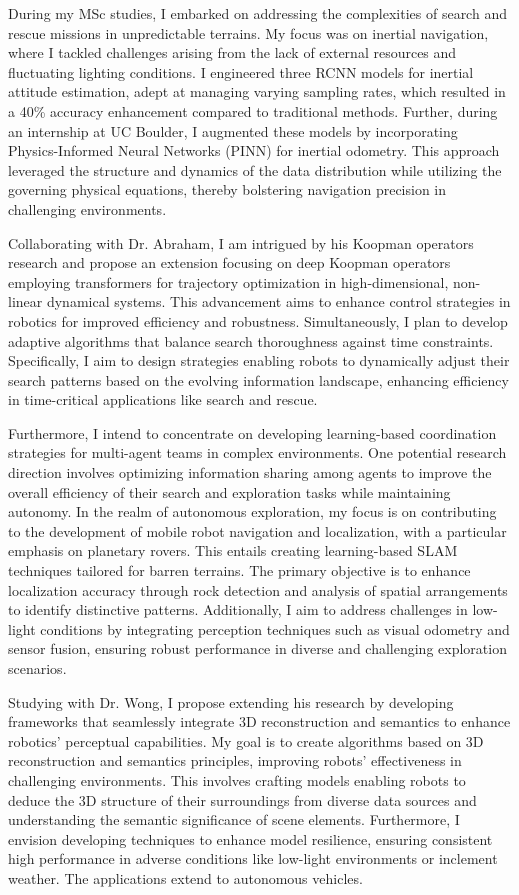 \documentclass[a4,20pt]{article}
\begin{document}
\begin{large}
During my MSc studies, I embarked on addressing the complexities of search and rescue missions in unpredictable terrains. My focus was on inertial navigation, where I tackled challenges arising from the lack of external resources and fluctuating lighting conditions. I engineered three RCNN models for inertial attitude estimation, adept at managing varying sampling rates, which resulted in a 40\% accuracy enhancement compared to traditional methods. Further, during an internship at UC Boulder, I augmented these models by incorporating Physics-Informed Neural Networks (PINN) for inertial odometry. This approach leveraged the structure and dynamics of the data distribution while utilizing the governing physical equations, thereby bolstering navigation precision in challenging environments.

Collaborating with Dr. Abraham, I am intrigued by his Koopman operators research and propose an extension focusing on deep Koopman operators employing transformers for trajectory optimization in high-dimensional, non-linear dynamical systems. This advancement aims to enhance control strategies in robotics for improved efficiency and robustness. Simultaneously, I plan to develop adaptive algorithms that balance search thoroughness against time constraints. Specifically, I aim to design strategies enabling robots to dynamically adjust their search patterns based on the evolving information landscape, enhancing efficiency in time-critical applications like search and rescue.

Furthermore, I intend to concentrate on developing learning-based coordination strategies for multi-agent teams in complex environments. One potential research direction involves optimizing information sharing among agents to improve the overall efficiency of their search and exploration tasks while maintaining autonomy. In the realm of autonomous exploration, my focus is on contributing to the development of mobile robot navigation and localization, with a particular emphasis on planetary rovers. This entails creating learning-based SLAM techniques tailored for barren terrains. The primary objective is to enhance localization accuracy through rock detection and analysis of spatial arrangements to identify distinctive patterns. Additionally, I aim to address challenges in low-light conditions by integrating perception techniques such as visual odometry and sensor fusion, ensuring robust performance in diverse and challenging exploration scenarios.

Studying with Dr. Wong, I propose extending his research by developing frameworks that seamlessly integrate 3D reconstruction and semantics to enhance robotics' perceptual capabilities. My goal is to create algorithms based on 3D reconstruction and semantics principles, improving robots' effectiveness in challenging environments. This involves crafting models enabling robots to deduce the 3D structure of their surroundings from diverse data sources and understanding the semantic significance of scene elements. Furthermore, I envision developing techniques to enhance model resilience, ensuring consistent high performance in adverse conditions like low-light environments or inclement weather. The applications extend to autonomous vehicles.



\end{large}
\end{document}

